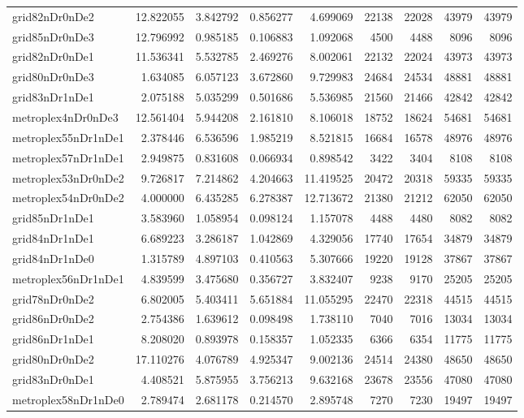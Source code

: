 \begin{longtable}{|l|r|r|r|r|r|r|r|r|}
grid82nDr0nDe2 & 12.822055 & 3.842792 & 0.856277 & 4.699069 & 22138 & 22028 & 43979 & 43979 \\
grid85nDr0nDe3 & 12.796992 & 0.985185 & 0.106883 & 1.092068 & 4500 & 4488 & 8096 & 8096 \\
grid82nDr0nDe1 & 11.536341 & 5.532785 & 2.469276 & 8.002061 & 22132 & 22024 & 43973 & 43973 \\
grid80nDr0nDe3 & 1.634085 & 6.057123 & 3.672860 & 9.729983 & 24684 & 24534 & 48881 & 48881 \\
grid83nDr1nDe1 & 2.075188 & 5.035299 & 0.501686 & 5.536985 & 21560 & 21466 & 42842 & 42842 \\
metroplex4nDr0nDe3 & 12.561404 & 5.944208 & 2.161810 & 8.106018 & 18752 & 18624 & 54681 & 54681 \\
metroplex55nDr1nDe1 & 2.378446 & 6.536596 & 1.985219 & 8.521815 & 16684 & 16578 & 48976 & 48976 \\
metroplex57nDr1nDe1 & 2.949875 & 0.831608 & 0.066934 & 0.898542 & 3422 & 3404 & 8108 & 8108 \\
metroplex53nDr0nDe2 & 9.726817 & 7.214862 & 4.204663 & 11.419525 & 20472 & 20318 & 59335 & 59335 \\
metroplex54nDr0nDe2 & 4.000000 & 6.435285 & 6.278387 & 12.713672 & 21380 & 21212 & 62050 & 62050 \\
grid85nDr1nDe1 & 3.583960 & 1.058954 & 0.098124 & 1.157078 & 4488 & 4480 & 8082 & 8082 \\
grid84nDr1nDe1 & 6.689223 & 3.286187 & 1.042869 & 4.329056 & 17740 & 17654 & 34879 & 34879 \\
grid84nDr1nDe0 & 1.315789 & 4.897103 & 0.410563 & 5.307666 & 19220 & 19128 & 37867 & 37867 \\
metroplex56nDr1nDe1 & 4.839599 & 3.475680 & 0.356727 & 3.832407 & 9238 & 9170 & 25205 & 25205 \\
grid78nDr0nDe2 & 6.802005 & 5.403411 & 5.651884 & 11.055295 & 22470 & 22318 & 44515 & 44515 \\
grid86nDr0nDe2 & 2.754386 & 1.639612 & 0.098498 & 1.738110 & 7040 & 7016 & 13034 & 13034 \\
grid86nDr1nDe1 & 8.208020 & 0.893978 & 0.158357 & 1.052335 & 6366 & 6354 & 11775 & 11775 \\
grid80nDr0nDe2 & 17.110276 & 4.076789 & 4.925347 & 9.002136 & 24514 & 24380 & 48650 & 48650 \\
grid83nDr0nDe1 & 4.408521 & 5.875955 & 3.756213 & 9.632168 & 23678 & 23556 & 47080 & 47080 \\
metroplex58nDr1nDe0 & 2.789474 & 2.681178 & 0.214570 & 2.895748 & 7270 & 7230 & 19497 & 19497 \\

\end{longtable}
